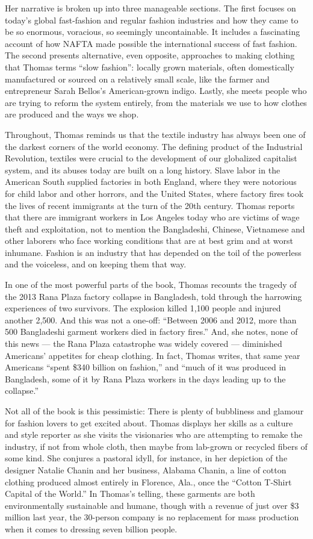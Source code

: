 Her narrative is broken up into three manageable sections. The first
focuses on today's global fast-fashion and regular fashion industries
and how they came to be so enormous, voracious, so seemingly
uncontainable. It includes a fascinating account of how NAFTA made
possible the international success of fast fashion. The second presents
alternative, even opposite, approaches to making clothing that Thomas
terms ``slow fashion'': locally grown materials, often domestically
manufactured or sourced on a relatively small scale, like the farmer and
entrepreneur Sarah Bellos's American-grown indigo. Lastly, she meets
people who are trying to reform the system entirely, from the materials
we use to how clothes are produced and the ways we shop.

Throughout, Thomas reminds us that the textile industry has always been
one of the darkest corners of the world economy. The defining product of
the Industrial Revolution, textiles were crucial to the development of
our globalized capitalist system, and its abuses today are built on a
long history. Slave labor in the American South supplied factories in
both England, where they were notorious for child labor and other
horrors, and the United States, where factory fires took the lives of
recent immigrants at the turn of the 20th century. Thomas reports that
there are immigrant workers in Los Angeles today who are victims of wage
theft and exploitation, not to mention the Bangladeshi, Chinese,
Vietnamese and other laborers who face working conditions that are at
best grim and at worst inhumane. Fashion is an industry that has
depended on the toil of the powerless and the voiceless, and on keeping
them that way.

In one of the most powerful parts of the book, Thomas recounts the
tragedy of the 2013 Rana Plaza factory collapse in Bangladesh, told
through the harrowing experiences of two survivors. The explosion killed
1,100 people and injured another 2,500. And this was not a one-off:
``Between 2006 and 2012, more than 500 Bangladeshi garment workers died
in factory fires.'' And, she notes, none of this news --- the Rana Plaza
catastrophe was widely covered --- diminished Americans' appetites for
cheap clothing. In fact, Thomas writes, that same year Americans ``spent
\$340 billion on fashion,'' and ``much of it was produced in Bangladesh,
some of it by Rana Plaza workers in the days leading up to the
collapse.''

Not all of the book is this pessimistic: There is plenty of bubbliness
and glamour for fashion lovers to get excited about. Thomas displays her
skills as a culture and style reporter as she visits the visionaries who
are attempting to remake the industry, if not from whole cloth, then
maybe from lab-grown or recycled fibers of some kind. She conjures a
pastoral idyll, for instance, in her depiction of the designer Natalie
Chanin and her business, Alabama Chanin, a line of cotton clothing
produced almost entirely in Florence, Ala., once the ``Cotton T-Shirt
Capital of the World.'' In Thomas's telling, these garments are both
environmentally sustainable and humane, though with a revenue of just
over \$3 million last year, the 30-person company is no replacement for
mass production when it comes to dressing seven billion people.

